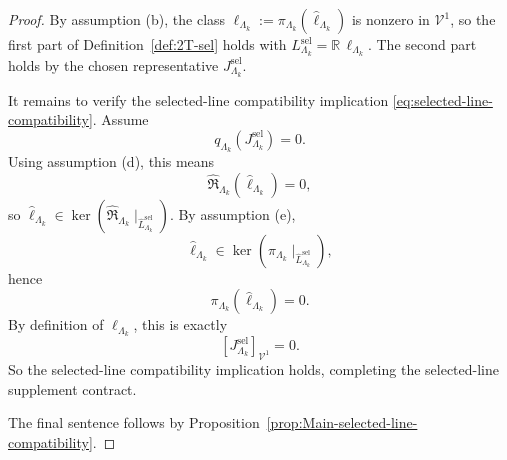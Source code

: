 \begin{proof}
By assumption \textnormal{(b)}, the class
\(
\ell_{\Lambda_k}:=\pi_{\Lambda_k}(\widehat\ell_{\Lambda_k})
\)
is nonzero in \(\mathcal V^1\), so the first part of
Definition~\ref{def:2T-sel} holds with
\(
L^{\mathrm{sel}}_{\Lambda_k}=\mathbb R\,\ell_{\Lambda_k}
\).
The second part holds by the chosen representative \(J^{\mathrm{sel}}_{\Lambda_k}\).

It remains to verify the selected-line compatibility implication
\eqref{eq:selected-line-compatibility}.
Assume
\[
q_{\Lambda_k}(J^{\mathrm{sel}}_{\Lambda_k})=0.
\]
Using assumption \textnormal{(d)}, this means
\[
\widehat{\mathfrak R}_{\Lambda_k}(\widehat\ell_{\Lambda_k})=0,
\]
so
\(
\widehat\ell_{\Lambda_k}\in
\ker(\widehat{\mathfrak R}_{\Lambda_k}\!\mid_{\widehat L^{\mathrm{sel}}_{\Lambda_k}})
\).
By assumption \textnormal{(e)},
\[
\widehat\ell_{\Lambda_k}\in
\ker(\pi_{\Lambda_k}\!\mid_{\widehat L^{\mathrm{sel}}_{\Lambda_k}}),
\]
hence
\[
\pi_{\Lambda_k}(\widehat\ell_{\Lambda_k})=0.
\]
By definition of \(\ell_{\Lambda_k}\), this is exactly
\[
[J^{\mathrm{sel}}_{\Lambda_k}]_{\mathcal V^1}=0.
\]
So the selected-line compatibility implication holds, completing the selected-line supplement
contract.

The final sentence follows by Proposition~\ref{prop:Main-selected-line-compatibility}.
\end{proof}

